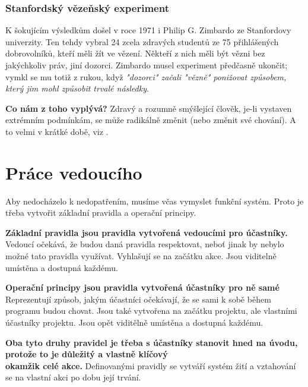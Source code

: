 \documentclass[a4paper,12pt]{report}
\begin{document}
\begin{samepage}
\subsection*{Stanfordský vězeňský experiment}
K šokujícím výsledkům došel v roce 1971 i Philip G. Zimbardo ze Stanfordovy univerzity. Ten tehdy vybral 24 zcela zdravých studentů ze 75 přihlášených dobrovolníků, kteří měli žít ve vězení. Někteří z nich měli být vězni bez jakýchkoliv práv, jiní dozorci. Zimbardo musel experiment předčasně ukončit; vymkl se mu totiž z rukou, když \textit{"dozorci" začali "vězně" ponižovat způsobem, který jim mohl způsobit trvalé následky}.

\begin{flushleft}
\textbf{\large Co nám z toho vyplývá?} Zdravý a rozumně smýšlející člověk, je-li vystaven extrémním podmínkám, se může radikálně změnit (nebo změnit své chování). A to velmi v krátké době, viz .
\end{flushleft}
\end{samepage}

\newpage
\pagelogos

\chapter{Práce vedoucího}
Aby nedocházelo k nedopatřením, musíme včas vymyslet funkční systém. Proto je třeba vytvořit základní pravidla a operační principy.

\textbf{Základní pravidla jsou pravidla vytvořená vedoucími pro účastníky.} 
Vedoucí očekává, že budou daná pravidla respektovat, neboť jinak by nebylo možné tato pravidla využívat. Vyhlašují se na začátku akce. Jsou viditelně umístěna a dostupná každému.

\textbf{Operační principy jsou pravidla vytvořená účastníky pro ně samé}
Reprezentují způsob, jakým účastníci očekávají, že se sami k sobě během programu budou chovat. Jsou také vytvořena na začátku projektu, ale vlastními účastníky projektu. Jsou opět viditělně umístěna a dostupná každému.

\textbf{Oba tyto druhy pravidel je třeba s účastníky stanovit hned na úvodu, protože to je důležitý a vlastně klíčový \\ okamžik celé akce.}
Definovanými pravidly se vytváří systém žití a vztahování se na vlastní akci po dobu její trvání.
\end{document}
